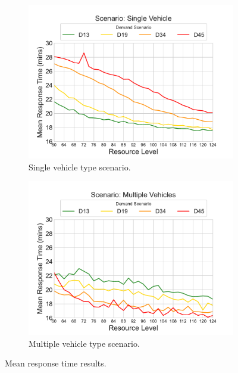 \documentclass[preprint,12pt]{elsarticle}
\begin{document}
\begin{figure}
\begin{center}
\begin{subfigure}{0.42\textwidth}
\includegraphics[width=\textwidth]{img/plots/single_MeanResponseTime}
\caption{Single vehicle type scenario.}
\label{fig:results_response_single}
\end{subfigure}
\begin{subfigure}{0.42\textwidth}
\includegraphics[width=\textwidth]{img/plots/multiple_MeanResponseTime}
\caption{Multiple vehicle type scenario.}
\label{fig:results_response_multiple}
\end{subfigure}
\end{center}
\caption{Mean response time results.}
\end{figure}
\end{document}

